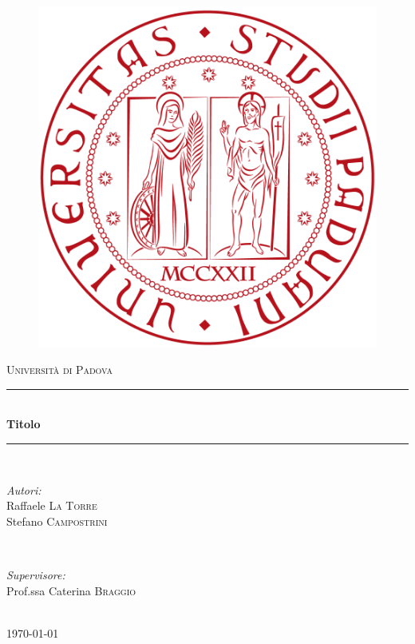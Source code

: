 \documentclass{article}
\begin{document}
\begin{titlepage}
\newcommand{\HRule}{\rule{\linewidth}{0.5mm}}
\center

\begin{figure}[!ht]
\includegraphics[scale=1]{logo}
\end{figure}

\textsc{\LARGE Università di Padova}\\[1.5cm]
\HRule \\[0.4cm]
{ \huge \bfseries Titolo}\\[0.4cm]
\HRule \\[1.5cm]

\begin{minipage}{0.4\textwidth}
\begin{flushleft} \large
\emph{Autori:}\\
Raffaele \textsc{La Torre} \\
Stefano \textsc{Campostrini}
\end{flushleft}
\end{minipage}
~
\begin{minipage}{0.4\textwidth}
\begin{flushright} \large
\emph{Supervisore:} \\
Prof.ssa Caterina \textsc{Braggio}
\end{flushright}
\end{minipage}\\[4cm]

{\large \today}\\[3cm]

\vfill
\end{titlepage}




 
\end{document}
